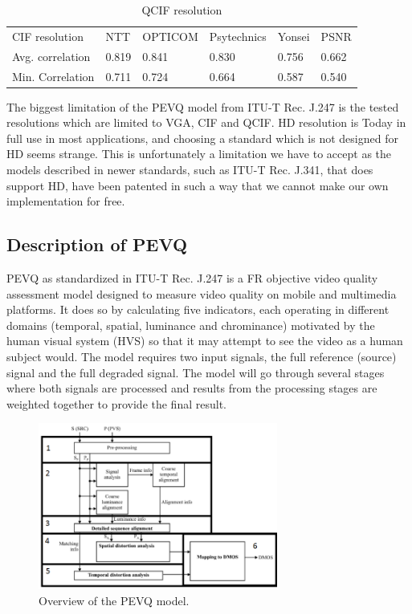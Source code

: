 \begin{table}[h]
    \center
    \caption{QCIF resolution}
    \begin{tabular}{llllll}
    CIF resolution   & NTT   & OPTICOM & Psytechnics & Yonsei & PSNR  \\
    Avg. correlation & 0.819 & 0.841   & 0.830       & 0.756  & 0.662 \\
    Min. Correlation & 0.711 & 0.724   & 0.664       & 0.587  & 0.540 \\
    \end{tabular}
    \label{table:qcifTable}
\end{table}

The biggest limitation of the PEVQ model from ITU-T Rec. J.247 is the tested resolutions which are limited to VGA, CIF and QCIF. HD resolution is Today in full use in most applications, and choosing a standard which is not designed for HD seems strange. This is unfortunately a limitation we have to accept as the models described in newer standards, such as ITU-T Rec. J.341, that does support HD, have been patented in such a way that we cannot make our own implementation for free. 

\subsection{Description of PEVQ}\label{sect:pevq}
PEVQ as standardized in ITU-T Rec. J.247 is a FR objective video quality assessment model designed to measure video quality on mobile and multimedia platforms. It does so by calculating five indicators, each operating in different domains (temporal, spatial, luminance and chrominance) motivated by the human visual system (HVS) so that it may attempt to see the video as a human subject would. The model requires two input signals, the full reference (source) signal and the full degraded signal. The model will go through several stages where both signals are processed and results from the processing stages are weighted together to provide the final result.

\begin{figure}[h]
	  \centering
	\includegraphics[width=0.7\textwidth,natwidth=662,natheight=588]{images/pevqOverview.png}
	\caption{Overview of the PEVQ model.}
	\label{fig:pevqOverview}
\end{figure}
	  
